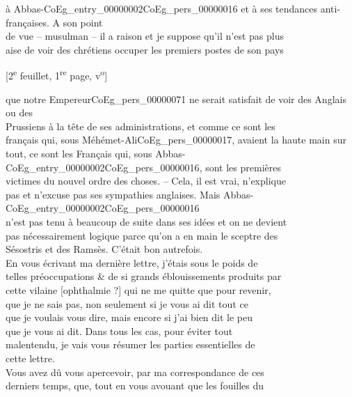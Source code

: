 \documentclass{book}
\begin{document}
à Abbas-\Gls{CoEg_entry_00000002}\gls{CoEg_pers_00000016} et à ses tendances anti-françaises. A son point\\
de vue – musulman – il a raison et je suppose qu’il n’est pas plus\\
aise de voir des chrétiens occuper les premiers postes de son pays
{\footnotesize\begin{center} {[2\textsuperscript{e} feuillet, 1\textsuperscript{re} page, v\textsuperscript{o}]}\end{center}}
\noindent que notre Empereur\gls{CoEg_pers_00000071} ne serait satisfait de voir des Anglais ou des\\
Prussiens à la tête de ses administrations, et comme ce sont les\\
français qui, sous Méhémet-Ali\gls{CoEg_pers_00000017}, avaient la haute main sur\\
tout, ce sont les Français qui, sous Abbas-\Gls{CoEg_entry_00000002}\gls{CoEg_pers_00000016}, sont les premières\\
victimes du nouvel ordre des choses. – Cela, il est vrai, n’explique\\
pas et n’excuse pas ses sympathies anglaises. Mais Abbas-\Gls{CoEg_entry_00000002}\gls{CoEg_pers_00000016}\\
n’est pas tenu à beaucoup de suite dans ses idées et on ne devient\\
pas nécessairement logique parce qu’on a en main le sceptre des\\
Sésostris et des Ramsès. C’était bon autrefois.\\
\indent En vous écrivant ma dernière lettre, j’étais sous le poids de\\
telles préoccupations \& de si grands éblouissements produits par\\
cette vilaine {[ophthalmie ?]} qui ne me quitte que pour revenir,\\
que je ne sais pas, non seulement si je vous ai dit tout ce\\
que je voulais vous dire, mais encore si j’ai bien dit le peu\\
que je vous ai dit. Dans tous les cas, pour éviter tout\\
malentendu, je vais vous résumer les parties essentielles de\\
cette lettre.\\
\indent Vous avez dû vous apercevoir, par ma correspondance de ces\\
derniers temps, que, tout en vous avouant que les fouilles du\\
\end{document}
